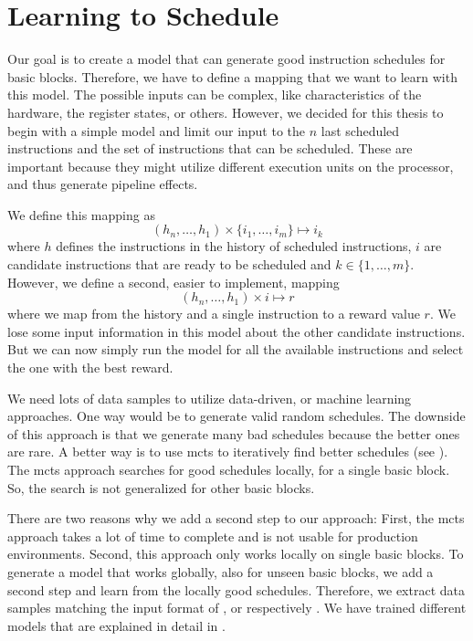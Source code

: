 \section{Learning to Schedule}
\label{sec:approach:ml}
Our goal is to create a model that can generate good instruction schedules for basic blocks.
Therefore, we have to define a mapping that we want to learn with this model.
The possible inputs can be complex, like characteristics of the hardware, the register states, or others.
However, we decided for this thesis to begin with a simple model and limit our input to the $n$ last scheduled instructions and the set of instructions that can be scheduled.
These are important because they might utilize different execution units on the processor, and thus generate pipeline effects.

We define this mapping as
\begin{equation}
    (h_n, \ldots, h_1) \times \{i_1, \ldots, i_m\} \mapsto i_k
    \label{eqn:mlmapping1}
\end{equation}
where $h$ defines the instructions in the history of scheduled instructions, $i$ are candidate instructions that are ready to be scheduled and $k \in \{1, \ldots, m\}$.
However, we define a second, easier to implement, mapping
\begin{equation}
    (h_n, \ldots, h_1) \times i \mapsto r
    \label{eqn:mlmapping2}
\end{equation}
where we map from the history and a single instruction to a reward value $r$.
We lose some input information in this model about the other candidate instructions.
But we can now simply run the model for all the available instructions and select the one with the best reward.

We need lots of data samples to utilize data-driven, or machine learning approaches.
One way would be to generate valid random schedules.
The downside of this approach is that we generate many bad schedules because the better ones are rare.
A better way is to use \ac{mcts} to iteratively find better schedules (see ).
The \ac{mcts} approach searches for good schedules locally, \ie for a single basic block.
So, the search is not generalized for other basic blocks.

There are two reasons why we add a second step to our approach:
First, the \ac{mcts} approach takes a lot of time to complete and is not usable for production environments.
Second, this approach only works locally on single basic blocks.
To generate a model that works globally, \ie also for unseen basic blocks, we add a second step and learn from the locally good schedules.
Therefore, we extract data samples matching the input format of , or respectively .
We have trained different models that are explained in detail in .

